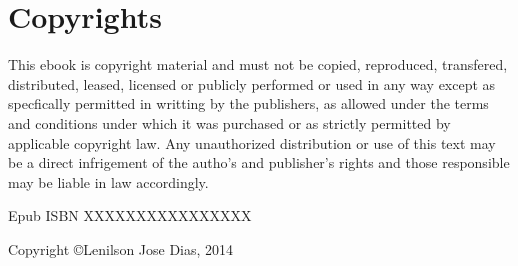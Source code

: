 \chapter{Copyrights}

This ebook is copyright material and must not be copied, reproduced, transfered, distributed, leased, licensed or publicly performed or used in any way except as specfically permitted in writting by the publishers, as allowed under the terms and conditions under which it was purchased or as strictly permitted by applicable copyright law. Any unauthorized distribution or use of this text may be a direct infrigement of the autho's and publisher's rights and those responsible may be liable in law accordingly.

\begin{center}
Epub ISBN XXXXXXXXXXXXXXXX
\end{center}

\begin{center}
Copyright \copyright Lenilson Jose Dias, 2014
\end{center}
